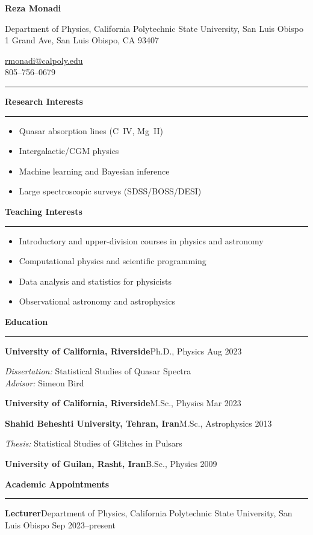 \documentclass[11pt,letterpaper]{scrartcl}
\makeatletter
\newcommand{\Name}{Reza Monadi}
\newcommand{\Email}{rmonadi@calpoly.edu}
\newcommand{\Phone}{805--756--0679}
\newcommand{\Dept}{Department of Physics}
\newcommand{\Inst}{California Polytechnic State University, San Luis Obispo }
\newcommand{\Addr}{1 Grand Ave, San Luis Obispo, CA 93407}
\newcommand{\cvsection}[1]{%
  \vspace{4pt}%
  {\large\bfseries\textcolor{accent}{#1}}\par
  \vspace{2pt}\hrule\vspace{6pt}
}
\newcommand{\entry}[3]{%
  \noindent\textbf{#1}\quad #2 \hfill {\small #3}\par
}
\makeatother
\begin{document}
\begin{minipage}[t]{0.64\textwidth}
  {\LARGE\bfseries \Name}\par
  \vspace{2pt}
  \Dept, \Inst \\
  \Addr
\end{minipage}%
\hfill
\begin{minipage}[t]{0.33\textwidth}\raggedleft
  \href{mailto:\Email}{\Email}\\
  \Phone
\end{minipage}

\vspace{6pt}\hrule\vspace{10pt}

\cvsection{Research Interests}
\begin{itemize}
\item{Quasar absorption lines (C~IV, Mg~II)}
\item Intergalactic/CGM physics
\item Machine learning and Bayesian inference
\item Large spectroscopic surveys (SDSS/BOSS/DESI)
\end{itemize}

\cvsection{Teaching Interests}
\begin{itemize}
\item Introductory and upper-division courses in physics and astronomy
\item Computational physics and scientific programming
\item Data analysis and statistics for physicists
\item Observational astronomy and astrophysics
\end{itemize}

\cvsection{Education}
\entry{University of California, Riverside}{Ph.D., Physics}{Aug 2023}
\emph{Dissertation:} Statistical Studies of Quasar Spectra \\
\emph{Advisor:} Simeon Bird

\entry{University of California, Riverside}{M.Sc., Physics}{Mar 2023}

\entry{Shahid Beheshti University, Tehran, Iran}{M.Sc., Astrophysics}{2013}
\emph{Thesis:} Statistical Studies of Glitches in Pulsars

\entry{University of Guilan, Rasht, Iran}{B.Sc., Physics}{2009}

\cvsection{Academic Appointments}
\entry{Lecturer}{\Dept, \Inst}{Sep 2023--present}
\end{document}
